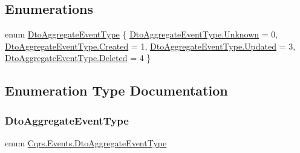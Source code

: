\subsection*{Enumerations}
\begin{DoxyCompactItemize}
\item 
enum \hyperlink{namespaceCqrs_1_1Events_a2a32e13adeac92f5a93966cd8ee2d39a}{Dto\+Aggregate\+Event\+Type} \{ \hyperlink{namespaceCqrs_1_1Events_a2a32e13adeac92f5a93966cd8ee2d39aa88183b946cc5f0e8c96b2e66e1c74a7e}{Dto\+Aggregate\+Event\+Type.\+Unknown} = 0, 
\hyperlink{namespaceCqrs_1_1Events_a2a32e13adeac92f5a93966cd8ee2d39aa0eceeb45861f9585dd7a97a3e36f85c6}{Dto\+Aggregate\+Event\+Type.\+Created} = 1, 
\hyperlink{namespaceCqrs_1_1Events_a2a32e13adeac92f5a93966cd8ee2d39aaff0a3b7f3daef040faf89a88fdac01b7}{Dto\+Aggregate\+Event\+Type.\+Updated} = 3, 
\hyperlink{namespaceCqrs_1_1Events_a2a32e13adeac92f5a93966cd8ee2d39aa5fe6005bf6e415c950c011fb65f12b8f}{Dto\+Aggregate\+Event\+Type.\+Deleted} = 4
 \}
\end{DoxyCompactItemize}


\subsection{Enumeration Type Documentation}
\mbox{\label{namespaceCqrs_1_1Events_a2a32e13adeac92f5a93966cd8ee2d39a}} 
\subsubsection{\texorpdfstring{Dto\+Aggregate\+Event\+Type}{DtoAggregateEventType}}
{\footnotesize\ttfamily enum \hyperlink{namespaceCqrs_1_1Events_a2a32e13adeac92f5a93966cd8ee2d39a}{Cqrs.\+Events.\+Dto\+Aggregate\+Event\+Type}\hspace{0.3cm}{\ttfamily [strong]}}


